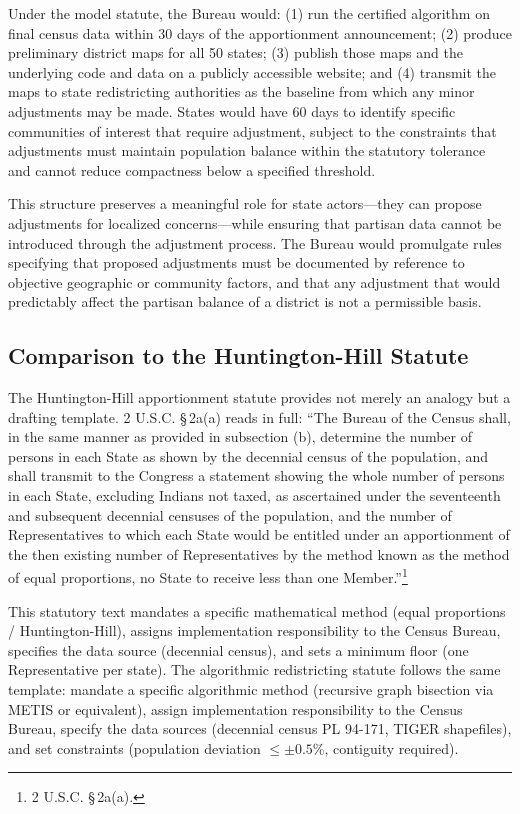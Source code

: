 Under the model statute, the Bureau would: (1) run the certified algorithm on final census data within 30 days of the apportionment announcement; (2) produce preliminary district maps for all 50 states; (3) publish those maps and the underlying code and data on a publicly accessible website; and (4) transmit the maps to state redistricting authorities as the baseline from which any minor adjustments may be made. States would have 60 days to identify specific communities of interest that require adjustment, subject to the constraints that adjustments must maintain population balance within the statutory tolerance and cannot reduce compactness below a specified threshold.

This structure preserves a meaningful role for state actors---they can propose adjustments for localized concerns---while ensuring that partisan data cannot be introduced through the adjustment process. The Bureau would promulgate rules specifying that proposed adjustments must be documented by reference to objective geographic or community factors, and that any adjustment that would predictably affect the partisan balance of a district is not a permissible basis.

\subsection{Comparison to the Huntington-Hill Statute}

The Huntington-Hill apportionment statute provides not merely an analogy but a drafting template. 2 U.S.C. \S\,2a(a) reads in full: ``The Bureau of the Census shall, in the same manner as provided in subsection (b), determine the number of persons in each State as shown by the decennial census of the population, and shall transmit to the Congress a statement showing the whole number of persons in each State, excluding Indians not taxed, as ascertained under the seventeenth and subsequent decennial censuses of the population, and the number of Representatives to which each State would be entitled under an apportionment of the then existing number of Representatives by the method known as the method of equal proportions, no State to receive less than one Member.''\footnote{2 U.S.C. \S\,2a(a).}

This statutory text mandates a specific mathematical method (equal proportions / Huntington-Hill), assigns implementation responsibility to the Census Bureau, specifies the data source (decennial census), and sets a minimum floor (one Representative per state). The algorithmic redistricting statute follows the same template: mandate a specific algorithmic method (recursive graph bisection via METIS or equivalent), assign implementation responsibility to the Census Bureau, specify the data sources (decennial census PL 94-171, TIGER shapefiles), and set constraints (population deviation $\leq \pm 0.5\%$, contiguity required).

